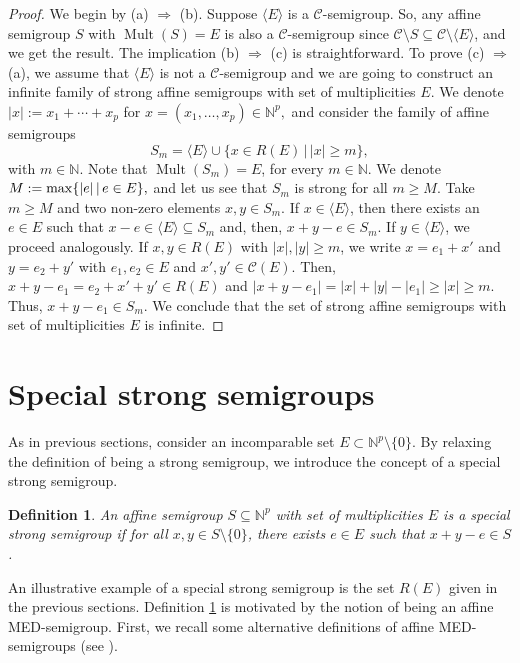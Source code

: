 \documentclass[a4paper,11pt]{article}
\newtheorem{definition}[theorem]{Definition}
\def\CaC{\mathcal{C}}
\def\N{\mathbb{N}}
\def\Mult{\operatorname{Mult}}
\begin{document}
{\begin{proof}
We begin by (a) $\Rightarrow$ (b). Suppose $\langle E \rangle $ is a $\CaC$-semigroup. So, any affine semigroup $S$ with $\Mult(S)=E$ is also a $\CaC$-semigroup since $\CaC\setminus S\subseteq \CaC\setminus \langle E \rangle$, and we get the result. The implication (b) $\Rightarrow$ (c) is straightforward. To prove (c) $\Rightarrow$ (a), we assume that $\langle E \rangle$ is not a $\CaC$-semigroup and we are going to construct an infinite family of strong affine semigroups with set of multiplicities $E$.
We denote $|x| := x_1+\cdots+x_p$ for $x = (x_1,\ldots,x_p) \in \N^p,$ and consider the family of affine semigroups \[S_m = \langle E \rangle \cup \{x \in R(E) \, \vert \, |x| \geq m\},\] with $m \in \N$. Note that $\Mult(S_m)=E$, for every $m\in \N$.
We denote $M := {\rm max}\{ |e| \, \vert \, e \in E\},$ and let us see that $S_m$ is strong for all $m \geq M$. Take $m \geq M$ and two non-zero elements $x,y \in S_m$. If $x \in \langle E \rangle$, then there exists an $e \in E$ such that $x - e \in \langle E \rangle \subseteq S_m$ and, then, $x+y-e \in  S_m$. If $y \in \langle E \rangle$, we proceed analogously.
If $x, y \in R(E)$ with $|x|,|y|\geq m$, we write $x = e_1 + x'$ and $y = e_2 + y'$ with $e_1, e_2 \in E$ and $x',y' \in \CaC(E)$. Then, $x+y-e_1 = e_2 + x' + y' \in R(E)$ and $|x+y-e_1| = |x| + |y| - |e_1| \geq |x| \geq m$. Thus, $x+y-e_1 \in S_m$.  We conclude that the set of strong affine semigroups with set of multiplicities $E$ is infinite.
\end{proof}


\section{Special strong semigroups}\label{sec:sss}
As in previous sections, consider an incomparable set $E\subset \N^p\setminus\{0\}$. By relaxing the definition of being a strong semigroup, we introduce the concept of a special strong semigroup.

\begin{definition}\label{definitionspecialStrong}
An affine semigroup $S\subseteq\N^p$ with set of multiplicities $E$ is a special strong semigroup if for all $x,y\in S\setminus\{0\}$, there exists $e\in E$ such that $x+y-e\in S$.
\end{definition}

An illustrative example of a special strong semigroup is the set $R(E)$ given in the previous sections. Definition \ref{definitionspecialStrong} is motivated by the notion of being an affine MED-semigroup. First, we recall some alternative definitions of affine MED-semigroups (see \cite{G-T-V25_MED}).

}
\end{document}
